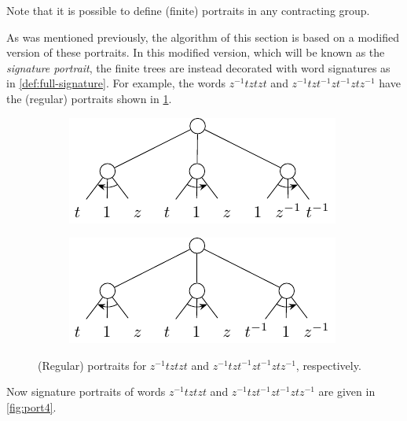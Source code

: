\begin{remark}
	Note that it is possible to define (finite) portraits in any contracting group.
	\thmendmark
\end{remark}

As was mentioned previously, the algorithm of this section is based on a modified version of these portraits.
In this modified version, which will be known as the \emph{signature portrait}, the finite trees are instead decorated with word signatures as in \cref{def:full-signature}.
For example, the words $z^{-1}tztzt$ and $z^{-1}tzt^{-1}zt^{-1}ztz^{-1}$ have the  (regular) portraits shown in \cref{fig:port3}. %

\begin{figure}[!ht]
	\centering
	
	\hfill
	\begin{subfigure}{.45\linewidth}
		\centering
		\includegraphics[width=\linewidth]{figures/portraits/ZtztztPortrait}
	\end{subfigure}
	\hfill
	\begin{subfigure}{.45\linewidth}
		\centering
		\includegraphics[width=\linewidth]{figures/portraits/ZtzTzTztZPortrait}
	\end{subfigure}
	\hfill

	\caption{(Regular) portraits for $z^{-1}tztzt$ and $z^{-1}tzt^{-1}zt^{-1}ztz^{-1}$, respectively.}
	\label{fig:port3}
\end{figure}

Now signature portraits of words $z^{-1}tztzt$ and $z^{-1}tzt^{-1}zt^{-1}ztz^{-1}$ are given in \cref{fig:port4}.

